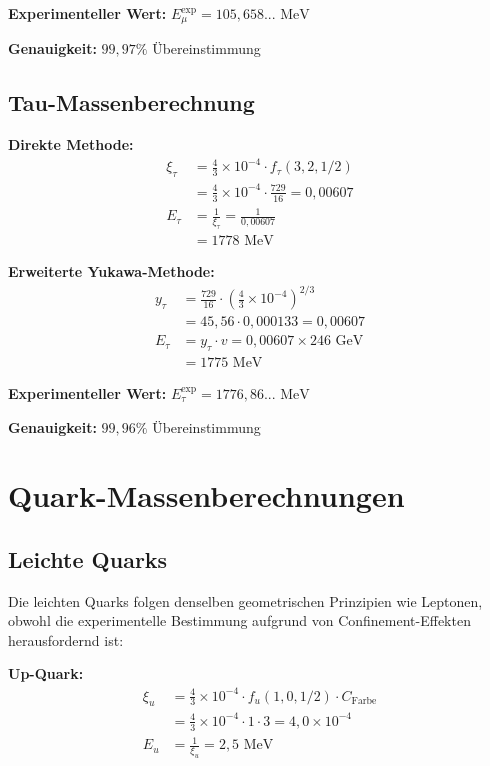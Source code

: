 \documentclass[12pt,a4paper]{article}
\begin{document}
	\textbf{Experimenteller Wert:} $E_\mu^{\text{exp}} = 105,658... \text{ MeV}$
	
	\textbf{Genauigkeit:} $99,97\%$ Übereinstimmung
	
	\subsection{Tau-Massenberechnung}
	\label{subsec:tau_calculation}
	
	\textbf{Direkte Methode:}
	\begin{align}
		\xi_\tau &= \frac{4}{3} \times 10^{-4} \cdot f_\tau(3,2,1/2) \\
		&= \frac{4}{3} \times 10^{-4} \cdot \frac{729}{16} = 0,00607 \\
		E_{\tau} &= \frac{1}{\xi_\tau} = \frac{1}{0,00607} \\
		&= 1778 \text{ MeV}
	\end{align}
	
	\textbf{Erweiterte Yukawa-Methode:}
	\begin{align}
		y_\tau &= \frac{729}{16} \cdot \left(\frac{4}{3} \times 10^{-4}\right)^{2/3} \\
		&= 45,56 \cdot 0,000133 = 0,00607 \\
		E_\tau &= y_\tau \cdot v = 0,00607 \times 246 \text{ GeV} \\
		&= 1775 \text{ MeV}
	\end{align}
	
	\textbf{Experimenteller Wert:} $E_\tau^{\text{exp}} = 1776,86... \text{ MeV}$
	
	\textbf{Genauigkeit:} $99,96\%$ Übereinstimmung
	
	\section{Quark-Massenberechnungen}
	\label{sec:quark_calculations}
	
	\subsection{Leichte Quarks}
	\label{subsec:light_quarks}
	
	Die leichten Quarks folgen denselben geometrischen Prinzipien wie Leptonen, obwohl die experimentelle Bestimmung aufgrund von Confinement-Effekten herausfordernd ist:
	
	\textbf{Up-Quark:}
	\begin{align}
		\xi_u &= \frac{4}{3} \times 10^{-4} \cdot f_u(1,0,1/2) \cdot C_{\text{Farbe}} \\
		&= \frac{4}{3} \times 10^{-4} \cdot 1 \cdot 3 = 4,0 \times 10^{-4} \\
		E_u &= \frac{1}{\xi_u} = 2,5 \text{ MeV}
	\end{align}
	
\end{document}
